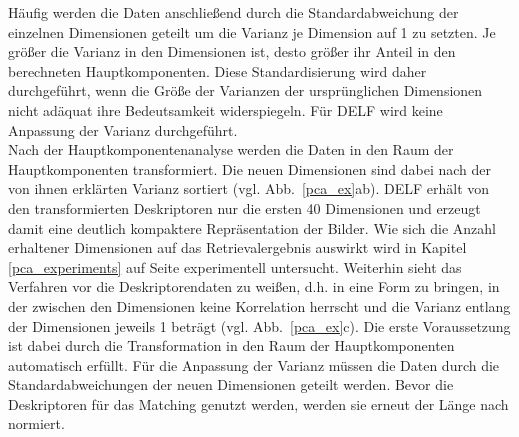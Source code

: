 Häufig werden die Daten anschließend durch die Standardabweichung der einzelnen Dimensionen geteilt um die Varianz je Dimension auf 1 zu setzten. Je größer die Varianz in den Dimensionen ist, desto größer ihr Anteil in den berechneten Hauptkomponenten. Diese Standardisierung wird daher durchgeführt, wenn die Größe der Varianzen der ursprünglichen Dimensionen nicht adäquat ihre Bedeutsamkeit widerspiegeln. Für DELF wird keine Anpassung der Varianz durchgeführt.
\\
Nach der Hauptkomponentenanalyse werden die Daten in den Raum der Hauptkomponenten transformiert. Die neuen Dimensionen sind dabei nach der von ihnen erklärten Varianz sortiert (vgl. Abb.~\ref{pca_ex}ab). DELF erhält von den transformierten Deskriptoren nur die ersten 40 Dimensionen und erzeugt damit eine deutlich kompaktere Repräsentation der Bilder. Wie sich die Anzahl erhaltener Dimensionen auf das Retrievalergebnis auswirkt wird in Kapitel \ref{pca_experiments} auf Seite \pageref{pca_experiments} experimentell untersucht. Weiterhin sieht das Verfahren vor die Deskriptorendaten zu weißen, d.h. in eine Form zu bringen, in der zwischen den Dimensionen keine Korrelation herrscht und die Varianz entlang der Dimensionen jeweils 1 beträgt (vgl. Abb.~\ref{pca_ex}c). Die erste Voraussetzung ist dabei durch die Transformation in den Raum der Hauptkomponenten automatisch erfüllt. Für die Anpassung der Varianz müssen die Daten durch die Standardabweichungen der neuen Dimensionen geteilt werden. Bevor die Deskriptoren für das Matching genutzt werden, werden sie erneut der Länge nach normiert.
%
